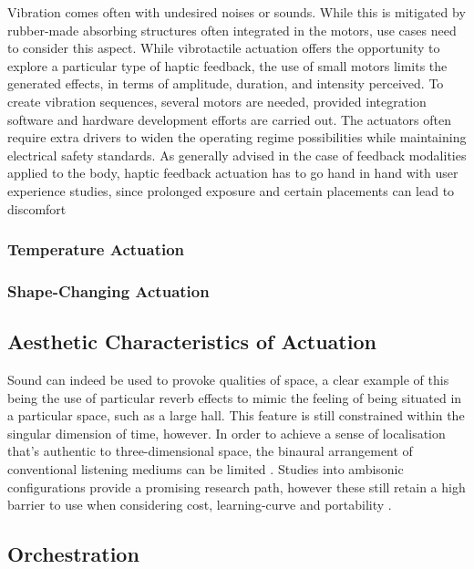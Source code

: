 Vibration comes often with undesired noises or sounds. While this is mitigated by rubber-made absorbing structures often integrated in the motors, use cases need to consider this aspect. While vibrotactile actuation offers the opportunity to explore a particular type of haptic feedback, the use of small motors limits the generated effects, in terms of amplitude, duration, and intensity perceived. To create vibration sequences, several motors are needed, provided integration software and hardware development efforts are carried out. The actuators often require extra drivers to widen the operating regime possibilities while maintaining electrical safety standards. As generally advised in the case of feedback modalities applied to the body, haptic feedback actuation has to go hand in hand with user experience studies, since prolonged exposure and certain placements can lead to discomfort

\subsubsection{Temperature Actuation}

\subsubsection{Shape-Changing Actuation}

\subsection{Aesthetic Characteristics of Actuation}

Sound can indeed be used to provoke qualities of space, a clear example of this being the use of particular reverb effects to mimic the feeling of being situated in a particular space, such as a large hall. This feature is still constrained within the singular dimension of time, however. In order to achieve a sense of localisation that's authentic to three-dimensional space, the binaural arrangement of conventional listening mediums can be limited \cite{chang_impairments_2018}. Studies into ambisonic configurations provide a promising research path, however these still retain a high barrier to use when considering cost, learning-curve and portability \cite{huisman_sound_2021}.  

\subsection{Orchestration} 

